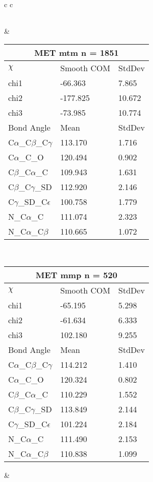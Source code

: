 \begin{longtable}{ c c }
\begin{tabular}{ l l l }
  \bottomrule
  \end{tabular}
  &
  \begin{tabular}{ l l l }
  \toprule
  \multicolumn{3}{c}{MET \textbf{mtm} n = 1851} \\ \toprule
  $\chi$       & Smooth COM & StdDev \\ \midrule
  chi1 & -66.363 & 7.865 \\ 
  chi2 & -177.825 & 10.672 \\ 
  chi3 & -73.985 & 10.774 \\ \midrule
  Bond Angle   & Mean     & StdDev \\ \midrule
  C$\alpha$\_C$\beta$\_C$\gamma$ & 113.170 & 1.716\\
  C$\alpha$\_C\_O & 120.494 & 0.902\\
  C$\beta$\_C$\alpha$\_C & 109.943 & 1.631\\
  C$\beta$\_C$\gamma$\_SD & 112.920 & 2.146\\
  C$\gamma$\_SD\_C$\epsilon$ & 100.758 & 1.779\\
  N\_C$\alpha$\_C & 111.074 & 2.323\\
  N\_C$\alpha$\_C$\beta$ & 110.665 & 1.072\\
  \bottomrule
  \end{tabular}
  \\
  \begin{tabular}{ l l l }
  \toprule
  \multicolumn{3}{c}{MET \textbf{mmp} n = 520} \\ \toprule
  $\chi$       & Smooth COM & StdDev \\ \midrule
  chi1 & -65.195 & 5.298 \\ 
  chi2 & -61.634 & 6.333 \\ 
  chi3 & 102.180 & 9.255 \\ \midrule
  Bond Angle   & Mean     & StdDev \\ \midrule
  C$\alpha$\_C$\beta$\_C$\gamma$ & 114.212 & 1.410\\
  C$\alpha$\_C\_O & 120.324 & 0.802\\
  C$\beta$\_C$\alpha$\_C & 110.229 & 1.552\\
  C$\beta$\_C$\gamma$\_SD & 113.849 & 2.144\\
  C$\gamma$\_SD\_C$\epsilon$ & 101.224 & 2.184\\
  N\_C$\alpha$\_C & 111.490 & 2.153\\
  N\_C$\alpha$\_C$\beta$ & 110.838 & 1.099\\
  \bottomrule
  \end{tabular}
  &
  \begin{tabular}{ l l l }

\end{tabular}
\end{longtable}
